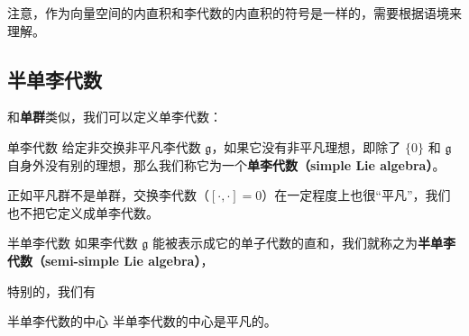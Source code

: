 注意，作为向量空间的内直积和李代数的内直积的符号是一样的，需要根据语境来理解。

\subsection{半单李代数}

和\textbf{单群}类似，我们可以定义单李代数：

\begin{definition}{单李代数}
给定非交换非平凡李代数 $\mathfrak{g}$，如果它没有非平凡理想，即除了 $\{0\}$ 和 $\mathfrak{g}$ 自身外没有别的理想，那么我们称它为一个\textbf{单李代数（simple Lie algebra）}。
\end{definition}

正如平凡群不是单群，交换李代数（$[\cdot, \cdot] = 0$）在一定程度上也很“平凡”，我们也不把它定义成单李代数。


\begin{definition}{半单李代数}\label{def_LieSub_1}
如果李代数 $\mathfrak{g}$ 能被表示成它的单子代数的直和，我们就称之为\textbf{半单李代数（semi-simple Lie algebra）}，
\end{definition}

特别的，我们有
\begin{theorem}{半单李代数的中心}
半单李代数的中心是平凡的。
\end{theorem}


